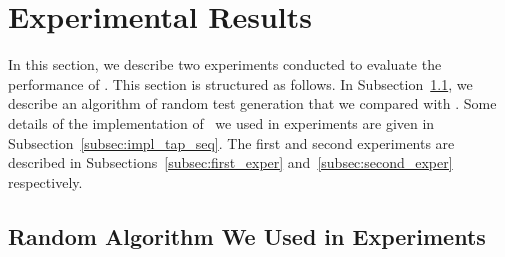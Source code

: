 \section{Experimental Results}
\label{sec:experiments}

In this  section, we describe two experiments  conducted to  evaluate the performance of \TS.
This section is structured as follows. In Subsection~\ref{subsec:rand_alg}, we describe an
 algorithm of random test generation that we compared with \TS. Some details of the implementation of \TS~we used
in experiments are given in Subsection~\ref{subsec:impl_tap_seq}. The first and second experiments
are described in Subsections~\ref{subsec:first_exper} and~\ref{subsec:second_exper} respectively.
\subsection{Random Algorithm We Used in Experiments}
\label{subsec:rand_alg}

